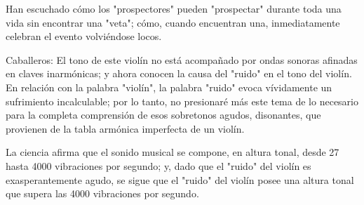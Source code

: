 \documentclass[12pt]{book}
\begin{document}
Han escuchado cómo los "prospectores" pueden "prospectar" durante toda una vida sin encontrar una "veta"; cómo, cuando encuentran una, inmediatamente celebran el evento volviéndose locos.

Caballeros: El tono de este violín no está acompañado por ondas sonoras afinadas en claves inarmónicas; y ahora conocen la causa del "ruido" en el tono del violín. En relación con la palabra "violín", la palabra "ruido" evoca vívidamente un sufrimiento incalculable; por lo tanto, no presionaré más este tema de lo necesario para la completa comprensión de esos sobretonos agudos, disonantes, que provienen de la tabla armónica imperfecta de un violín.

La ciencia afirma que el sonido musical se compone, en altura tonal, desde 27 hasta 4000 vibraciones por segundo; y, dado que el "ruido" del violín es exasperantemente agudo, se sigue que el "ruido" del violín posee una altura tonal que supera las 4000 vibraciones por segundo.
\end{document}
